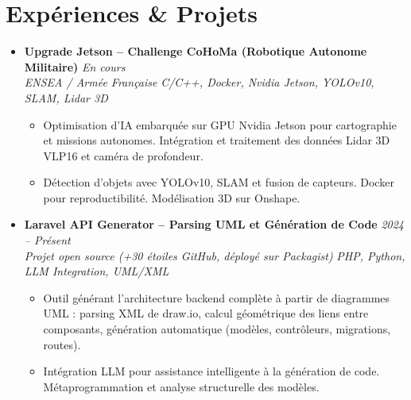 \documentclass[a4paper,11pt]{article}
\begin{document}
\section{Expériences \& Projets}
\begin{itemize}[leftmargin=*, label={-}]

\item \textbf{Upgrade Jetson -- Challenge CoHoMa (Robotique Autonome Militaire)} \hfill \textit{En cours} \\
\textit{ENSEA / Armée Française} \hfill \textit{C/C++, Docker, Nvidia Jetson, YOLOv10, SLAM, Lidar 3D}
\vspace{-2pt}
    \begin{itemize}[leftmargin=0.4cm, nosep, label=\tiny$\bullet$]
        \item \small{Optimisation d'IA embarquée sur GPU Nvidia Jetson pour cartographie et missions autonomes. Intégration et traitement des données Lidar 3D VLP16 et caméra de profondeur.}
        \item \small{Détection d'objets avec YOLOv10, SLAM et fusion de capteurs. Docker pour reproductibilité. Modélisation 3D sur Onshape.}
    \end{itemize}
\vspace{3pt}

\item \textbf{Laravel API Generator -- Parsing UML et Génération de Code} \hfill \textit{2024 -- Présent} \\
\textit{Projet open source (+30 étoiles GitHub, déployé sur Packagist)} \hfill \textit{PHP, Python, LLM Integration, UML/XML}
\vspace{-2pt}
    \begin{itemize}[leftmargin=0.4cm, nosep, label=\tiny$\bullet$]
        \item \small{Outil générant l'architecture backend complète à partir de diagrammes UML : parsing XML de draw.io, calcul géométrique des liens entre composants, génération automatique (modèles, contrôleurs, migrations, routes).}
        \item \small{Intégration LLM pour assistance intelligente à la génération de code. Métaprogrammation et analyse structurelle des modèles.}
    \end{itemize}
\vspace{3pt}


\end{itemize}
\end{document}
